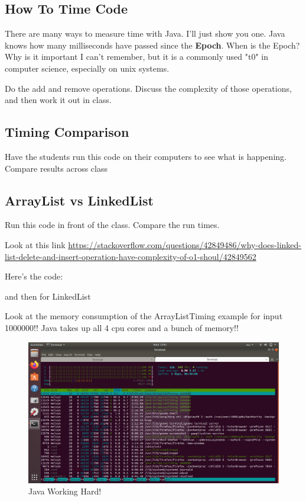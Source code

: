 \documentclass[12pt]{article}
\begin{document}
\subsection{How To Time Code}
There are many ways to measure time with Java. I'll just show you one. Java knows how many milliseconds have passed since the \textbf{Epoch}. When is the Epoch? Why is it important I can't remember, but it is a commonly used "t0" in computer science, especially on unix systems. 

Do the add and remove operations. Discuss the complexity of those operations, and then work it out in class.

\subsection{Timing Comparison}

Have the students run this code on their computers to see what is happening. Compare results across class



\subsection{ArrayList vs LinkedList}
Run this code in front of the class. Compare the run times.

Look at this link
\url{https://stackoverflow.com/questions/42849486/why-does-linked-list-delete-and-insert-operation-have-complexity-of-o1-shoul/42849562}

Here's the code:



and then for LinkedList



Look at the memory consumption of the ArrayListTiming example for input 1000000!! Java takes up all 4 cpu cores and a bunch of memory!!

\begin{figure}[h]
  \centering
    \includegraphics[width=\textwidth]{htop.png}
  \caption{Java Working Hard!}
\end{figure}
\end{document}
